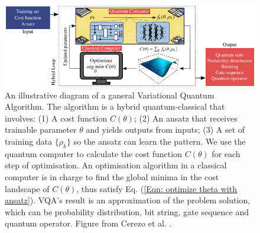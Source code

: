 
\begin{figure}
    \centering
    \includegraphics[width=\linewidth]{Appendices/vqadiagram.png}
    \caption{
        An illustrative diagram of a ganeral Variational Quantum Algorithm.
        The algorithm is a hybrid quantum-classical that involves:
        (1) A cost function $C(\theta)$;
        (2) An ansatz that receives trainable parameter $\theta$ and yields outputs from inputs;
        (3) A set of training data $\{\rho_k\}$ so the ansatz can learn the pattern.
        We use the quantum computer to calculate the cost function $C(\theta)$ for each step of optimisation.
        An optimisation algorithm in a classical computer is in charge to find the global minima in the cost landscape of $C(\theta)$, thus satisfy Eq. (\ref{Eqn: optimize theta with ansatz}).
        VQA's result is an approximation of the problem solution, which can be probability distribution, bit string, gate sequence and quantum operator.
        Figure from Cerezo et al. \cite{cerezo2021variational}.
    }
    \label{Fig: VQA diagram}
\end{figure}







